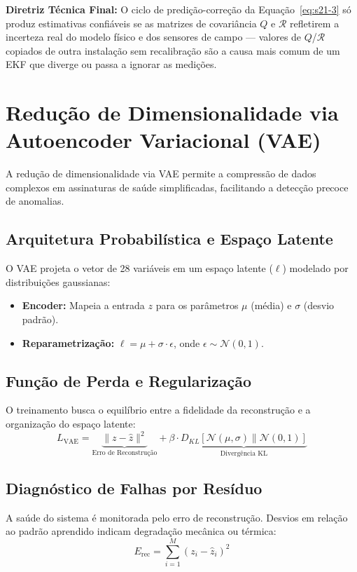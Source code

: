 \documentclass[12pt,a4paper]{article}
\numberwithin{equation}{section}
\numberwithin{table}{section}
\numberwithin{figure}{section}
\begin{document}
	\textbf{Diretriz Técnica Final:} O ciclo de predição-correção da Equação~\eqref{eq:s21-3} só produz estimativas confiáveis se as matrizes de covariância $Q$ e $\mathcal{R}$ refletirem a incerteza real do modelo físico e dos sensores de campo — valores de $Q$/$\mathcal{R}$ copiados de outra instalação sem recalibração são a causa mais comum de um EKF que diverge ou passa a ignorar as medições.

	\section{Redução de Dimensionalidade via Autoencoder Variacional (VAE)}
	
	A redução de dimensionalidade via VAE permite a compressão de dados complexos em assinaturas de saúde simplificadas, facilitando a detecção precoce de anomalias.
	
	\subsection{Arquitetura Probabilística e Espaço Latente}
	O VAE projeta o vetor de 28 variáveis em um espaço latente ($\ell$) modelado por distribuições gaussianas:
	\begin{itemize}
		\item \textbf{Encoder:} Mapeia a entrada $z$ para os parâmetros $\mu$ (média) e $\sigma$ (desvio padrão).
		\item \textbf{Reparametrização:} $\ell = \mu + \sigma \cdotp \epsilon$, onde $\epsilon \sim \mathcal{N}(0,1)$.
	\end{itemize}
	
	\subsection{Função de Perda e Regularização}
	O treinamento busca o equilíbrio entre a fidelidade da reconstrução e a organização do espaço latente:
	\begin{equation}\label{eq:s22-1}
	L_{\text{VAE}} = \underbrace{\| z - \hat{z} \|^2}_{\text{Erro de Reconstrução}} + \beta \cdotp \underbrace{D_{KL} [ \mathcal{N}(\mu, \sigma) \parallel \mathcal{N}(0, 1) ]}_{\text{Divergência KL}}
\end{equation}
	
	\subsection{Diagnóstico de Falhas por Resíduo}
	A saúde do sistema é monitorada pelo erro de reconstrução. Desvios em relação ao padrão aprendido indicam degradação mecânica ou térmica:
	\begin{equation}\label{eq:s22-2}
 E_{\text{rec}} = \sum_{i=1}^{M} (z_i - \hat{z}_i)^2
\end{equation}
\end{document}
